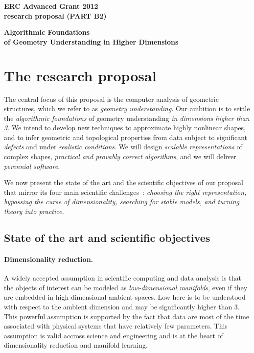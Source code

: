 \thispagestyle{empty}

\mbox{}\vspace{-3.5cm}

\begin{center}
{\Large
{\bf ERC Advanced Grant 2012 \\ research proposal (PART B2)}}
\vspace{1cm}

{\LARGE {\bf  Algorithmic Foundations \\ of 
Geometry Understanding in Higher Dimensions}

\vspace{3mm} 

}
\end{center}
\section{The research proposal}

The central focus of this  proposal is  the computer analysis of geometric structures, which we refer to as {\em geometry understanding}. Our ambition is to settle the {\em algorithmic foundations} of geometry understanding  {\em in dimensions higher than 3}. We intend to develop new techniques to approximate highly nonlinear shapes, and to infer geometric and topological properties from data subject to significant {\em defects} and under {\em realistic conditions}. 
We will design {\em scalable representations} of complex shapes,  {\em practical and provably correct algorithms}, and we will deliver {\em perennial software}.

We now present the state of the art and the scientific objectives of our proposal that mirror its four main scientific challenges~: {\em choosing the right representation, bypassing the curse of dimensionality, searching for stable models, and turning theory into practice.}


\subsection{State of the art and scientific objectives}

\paragraph{Dimensionality reduction.} A widely accepted assumption in scientific computing and data analysis is that the objects of interest can be modeled as {\em low-dimensional manifolds}, even if they are embedded in high-dimensional ambient spaces. Low here is to be understood with respect to the ambient dimension and may be significantly higher than 3. This powerful assumption is supported by the fact that data are most of the time associated with physical systems that have relatively few parameters.  This assumption is valid accross science and engineering and is at the heart of dimensionality reduction and manifold learning.

